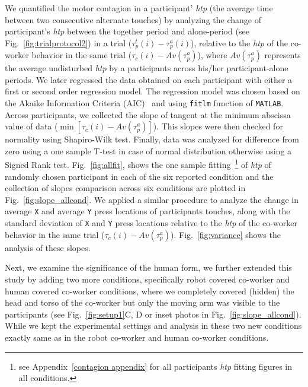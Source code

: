 We quantified the motor contagion in a participant' {\it htp} (the average time between two consecutive alternate touches) by analyzing the change of participant's {\it htp} between the together period and alone-period (see Fig.~\ref{fig:trialprotocol2}) in a trial ($\tau_p^t(i)-\tau_p^a(i)$), relative to the {\it htp} of the co-worker behavior in the same trial ($\tau_c (i)-Av(\tau_p^a)$), where $Av(\tau_p^a)$ represents the average undisturbed {\it htp} by a participants across his/her participant-alone periods. We later regressed the data obtained on each participant with either a first or second order regression model. The regression model was chosen based on the Akaike Information Criteria (AIC)~\cite{Akaike:ISIT:1973} and using {\tt fitlm} function of \texttt{MATLAB}. Across participants, we collected the slope of tangent at the minimum abscissa value of data ($\min[\tau_c(i)-Av(\tau_p^a)]$). This slopes were then checked for normality using Shapiro-Wilk test. Finally, data was analyzed for difference from zero using a one sample T-test in case of normal distribution otherwise using a Signed Rank test. Fig.~\ref{fig:allfit}, shows the one sample fitting~\footnote{see Appendix~\ref{contagion appendix} for all participants \textit{htp} fitting figures in all conditions.} of \textit{htp} of randomly chosen participant in each of the six reported condition and the collection of slopes comparison across six conditions are plotted in Fig.~\ref{fig:slope_allcond}. We applied a similar procedure to analyze the change in average \texttt{X} and average \texttt{Y} press locations of participants touches, along with the standard deviation of \texttt{X} and \texttt{Y} press locations relative to the {\it htp} of the co-worker behavior in the same trial ($\tau_c(i)-Av(\tau_p^a)$). Fig.~\ref{fig:variance} shows the analysis of these slopes.

Next, we examine the significance of the human form, we further extended this study by adding two more conditions, specifically robot covered co-worker and human covered co-worker conditions, where we completely covered (hidden) the head and torso of the co-worker but only the moving arm was visible to the participants (see Fig.~\ref{fig:setup1}C, D or inset photos in Fig.~\ref{fig:slope_allcond}). While we kept the experimental settings and analysis in these two new conditions exactly same as in the robot co-worker and human co-worker conditions.



